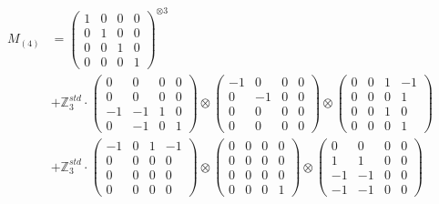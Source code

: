 \documentclass{article}
\newcommand{\Mthree}{%
    M_{(4)}
}
\begin{document}
        \footnotesize{
        \begin{align}
        \Mthree
        &= \label{Rs1-Rc16-Solution-4-c1} \begin{pmatrix} 1 & 0 & 0 & 0 \\ 0 & 1 & 0 & 0 \\ 0 & 0 & 1 & 0 \\ 0 & 0 & 0 & 1 \end{pmatrix}^{\otimes 3} \\
        &+ \label{Rs1-Rc16-Solution-4-c2} \mathbb{Z}_3^{std} \cdot 
            \begin{pmatrix} 0 & 0 & 0 & 0 \\ 0 & 0 & 0 & 0 \\ -1 & -1 & 1 & 0 \\ 0 & -1 & 0 & 1 \end{pmatrix} \otimes 
            \begin{pmatrix} -1 & 0 & 0 & 0 \\ 0 & -1 & 0 & 0 \\ 0 & 0 & 0 & 0 \\ 0 & 0 & 0 & 0 \end{pmatrix} \otimes 
            \begin{pmatrix} 0 & 0 & 1 & -1 \\ 0 & 0 & 0 & 1 \\ 0 & 0 & 1 & 0 \\ 0 & 0 & 0 & 1 \end{pmatrix} \\ 
        &+ \label{Rs1-Rc16-Solution-4-c3} \mathbb{Z}_3^{std} \cdot 
            \begin{pmatrix} -1 & 0 & 1 & -1 \\ 0 & 0 & 0 & 0 \\ 0 & 0 & 0 & 0 \\ 0 & 0 & 0 & 0 \end{pmatrix} \otimes 
            \begin{pmatrix} 0 & 0 & 0 & 0 \\ 0 & 0 & 0 & 0 \\ 0 & 0 & 0 & 0 \\ 0 & 0 & 0 & 1 \end{pmatrix} \otimes 
            \begin{pmatrix} 0 & 0 & 0 & 0 \\ 1 & 1 & 0 & 0 \\ -1 & -1 & 0 & 0 \\ -1 & -1 & 0 & 0 \end{pmatrix} \\ 

\end{align}}
\end{document}
